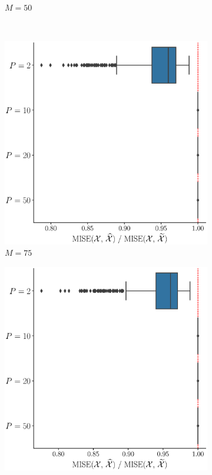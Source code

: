 \begin{results}
\begin{figure}
\begin{subfigure}[b]{0.49\textwidth}
         \caption{$M = 50$}
         \label{fig:mise_mfd_1d_50}
     \end{subfigure}
     \\
     \begin{subfigure}[b]{0.49\textwidth}
         \centering
         \includegraphics[width=\textwidth]{figures/scenario_1/mise_N50_M75.eps}
         \caption{$M = 75$}
         \label{fig:mise_mfd_1d_75}
     \end{subfigure}
     \begin{subfigure}[b]{0.49\textwidth}
         \centering
         \includegraphics[width=\textwidth]{figures/scenario_1/mise_N50_M100.eps}

\end{subfigure}
\end{figure}
\end{results}
